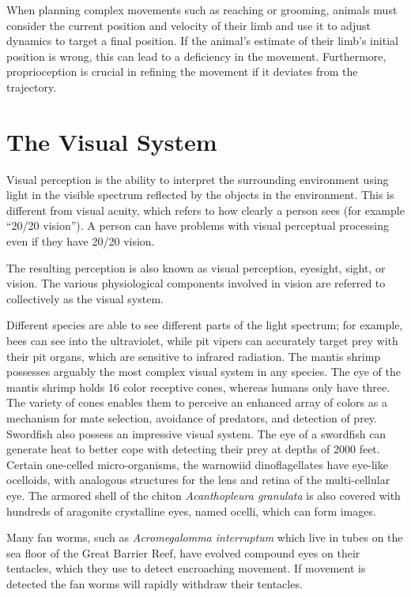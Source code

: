 \documentclass[]{book}
\begin{document}
When planning complex movements such as reaching or grooming, animals must consider the current position and velocity of their limb and use it to adjust dynamics to target a final position. If the animal's estimate of their limb's initial position is wrong, this can lead to a deficiency in the movement. Furthermore, proprioception is crucial in refining the movement if it deviates from the trajectory.

\hypertarget{the-visual-system}{%
\chapter{The Visual System}\label{the-visual-system}}

Visual perception is the ability to interpret the surrounding environment using light in the visible spectrum reflected by the objects in the environment. This is different from visual acuity, which refers to how clearly a person sees (for example ``20/20 vision''). A person can have problems with visual perceptual processing even if they have 20/20 vision.

The resulting perception is also known as visual perception, eyesight, sight, or vision. The various physiological components involved in vision are referred to collectively as the visual system.

Different species are able to see different parts of the light spectrum; for example, bees can see into the ultraviolet, while pit vipers can accurately target prey with their pit organs, which are sensitive to infrared radiation. The mantis shrimp possesses arguably the most complex visual system in any species. The eye of the mantis shrimp holds 16 color receptive cones, whereas humans only have three. The variety of cones enables them to perceive an enhanced array of colors as a mechanism for mate selection, avoidance of predators, and detection of prey. Swordfish also possess an impressive visual system. The eye of a swordfish can generate heat to better cope with detecting their prey at depths of 2000 feet. Certain one-celled micro-organisms, the warnowiid dinoflagellates have eye-like ocelloids, with analogous structures for the lens and retina of the multi-cellular eye. The armored shell of the chiton \emph{Acanthopleura granulata} is also covered with hundreds of aragonite crystalline eyes, named ocelli, which can form images.

Many fan worms, such as \emph{Acromegalomma interruptum} which live in tubes on the sea floor of the Great Barrier Reef, have evolved compound eyes on their tentacles, which they use to detect encroaching movement. If movement is detected the fan worms will rapidly withdraw their tentacles.
\end{document}

